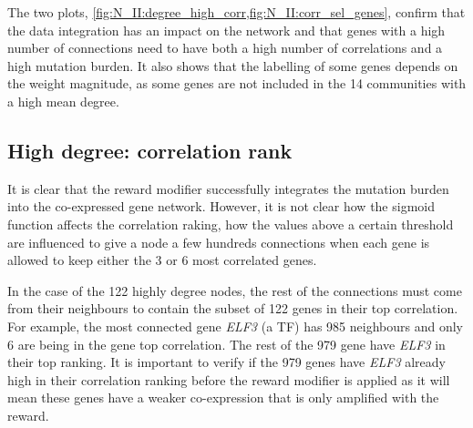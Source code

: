 The two plots, \cref{fig:N_II:degree_high_corr,fig:N_II:corr_sel_genes}, confirm that the data integration has an impact on the network and that genes with a high number of connections need to have both a high number of correlations and a high mutation burden. It also shows that the labelling of some genes depends on the weight magnitude, as some genes are not included in the 14 communities with a high mean degree.




\subsection{High degree: correlation rank} \label{s:N_II:corr_rank}

It is clear that the reward modifier successfully integrates the mutation burden into the co-expressed gene network. However, it is not clear how the sigmoid function affects the correlation raking, how the values above a certain threshold are influenced to give a node a few hundreds connections when each gene is allowed to keep either the 3 or 6 most correlated genes.

In the case of the 122 highly degree nodes, the rest of the connections must come from their neighbours to contain the subset of 122 genes in their top correlation. For example, the most connected gene \textit{ELF3} (a TF) has 985 neighbours and only 6 are being in the gene top correlation. The rest of the 979 gene have \textit{ELF3} in their top ranking. It is important to verify if the 979 genes have \textit{ELF3} already high in their correlation ranking before the reward modifier is applied as it will mean these genes have a weaker co-expression that is only amplified with the reward.

